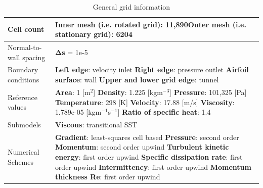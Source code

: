\begin{table}[H]
\caption{General grid information}
	\centering
	\begin{tabular}{|l|p{4.5in}|} \hline
		Cell count & \textbf{Inner mesh} (i.e. rotated grid): 11,890\newline \textbf{Outer mesh} (i.e. stationary grid): 6204 \\ \hline
		Normal-to-wall spacing & $\boldsymbol{\Delta}$\textbf{s} = 1e-5 \\ \hline
		Boundary conditions & \textbf{Left edge}: velocity inlet \newline \textbf{Right edge}: pressure outlet \newline \textbf{Airfoil surface}: wall \newline \textbf{Upper and lower grid edge}: tunnel \\ \hline
		Reference values & \textbf{Area}: 1 [m$^2$] \newline \textbf{Density}: 1.225 [kgm$^{-3}$] \newline \textbf{Pressure}: 101,325 [Pa] \newline \textbf{Temperature}: 298 [K] \newline \textbf{Velocity}: 17.88 [m/s] \newline \textbf{Viscosity}: 1.789e-05 [kgm$^{-1}$s$^{-1}$] \newline \textbf{Ratio of specific heat}: 1.4 \\ \hline
		Submodels & \textbf{Viscous}: transitional SST \\ \hline
		Numerical Schemes & \textbf{Gradient}: least-squares cell based \newline \textbf{Pressure}: second order \newline \textbf{Momentum}: second order upwind \newline \textbf{Turbulent kinetic energy}: first order upwind \newline \textbf{Specific dissipation rate}: first order upwind \newline \textbf{Intermittency}: first order upwind \newline \textbf{Momentum thickness Re}: first order upwind \\ \hline
	\end{tabular}
\end{table}



